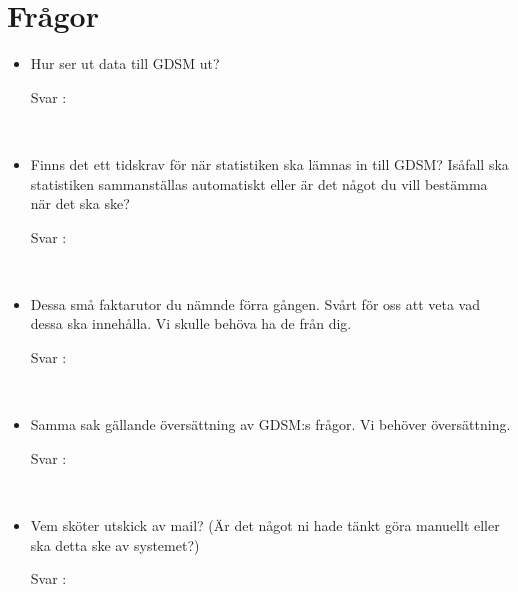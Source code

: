 \documentclass{article}
\date {#1}
\title {
    \documentTitle {Helsingborg Event and Convention Bureau}
    
    \documentDate {}
}
\begin{document}
\maketitle
\thispagestyle{empty}

\newpage




\newpage

\section{Frågor}

 
\begin{itemize}
    \item Hur ser ut data till GDSM ut?
        \begin{description}
            \item[Svar :]
        \end{description}
    \\
     \item Finns det ett tidskrav för när statistiken ska lämnas in till GDSM? Isåfall ska statistiken sammanställas automatiskt eller är det något du vill bestämma när det ska ske?
        \begin{description}
            \item[Svar :]
        \end{description}
    \\
    \item Dessa små faktarutor du nämnde förra gången. Svårt för oss att veta vad dessa ska innehålla. Vi skulle behöva ha de från dig.
        \begin{description}
            \item[Svar :]
        \end{description}  
    \\
     \item Samma sak gällande översättning av GDSM:s frågor. Vi behöver översättning. 
        \begin{description}
            \item[Svar :]
        \end{description}
    \\
    \item Vem sköter utskick av mail? (Är det något ni hade tänkt göra manuellt eller ska detta ske av systemet?)
        \begin{description}
            \item[Svar :]

\end{description}
\end{itemize}
\end{document}
